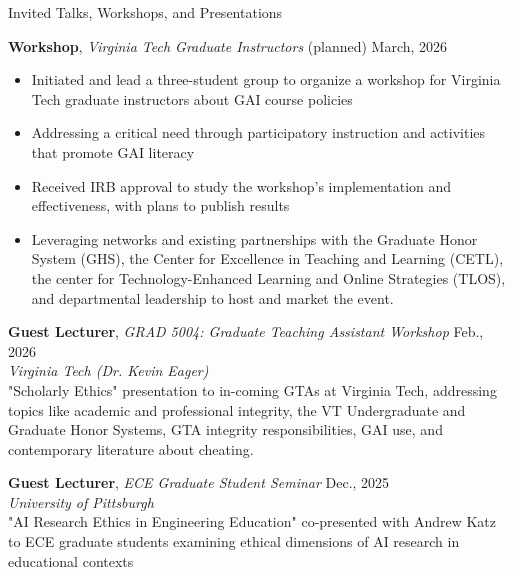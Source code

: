 \documentclass{resume}
\begin{document}
\begin{rSection}{Invited Talks, Workshops, and Presentations} 

{\bf Workshop}{, \emph{Virginia Tech Graduate Instructors}} {\hfill (planned) March, 2026}
\begin{itemize}
    \item \vspace{-0.5em} \hspace{-1em} Initiated and lead a three-student group to organize a workshop for Virginia Tech graduate instructors about GAI course policies
    \item \vspace{-0.5em} \hspace{-1em} Addressing a critical need through participatory instruction and activities that promote GAI literacy
    \item \vspace{-0.5em} \hspace{-1em} Received IRB approval to study the workshop's implementation and effectiveness, with plans to publish results  
    \item \vspace{-0.5em} \hspace{-1em} Leveraging networks and existing partnerships with the Graduate Honor System (GHS), the Center for Excellence in Teaching and Learning (CETL), the center for Technology-Enhanced Learning and Online Strategies (TLOS), and departmental leadership to host and market the event.
\end{itemize}


{\bf Guest Lecturer}{, \emph{GRAD 5004: Graduate Teaching Assistant Workshop }} {\hfill Feb., 2026} \\
\emph{Virginia Tech (Dr. Kevin Eager)}\\
"Scholarly Ethics" presentation to in-coming GTAs at Virginia Tech, addressing topics like academic and professional integrity, the VT Undergraduate and Graduate Honor Systems, GTA integrity responsibilities, GAI use, and contemporary literature about cheating.  

{\bf Guest Lecturer}{, \emph{ECE Graduate Student Seminar}} {\hfill Dec., 2025} \\
\emph{University of Pittsburgh}\\
"AI Research Ethics in Engineering Education" co-presented with Andrew Katz to ECE graduate students examining ethical dimensions of AI research in educational contexts


\end{rSection}
\end{document}
